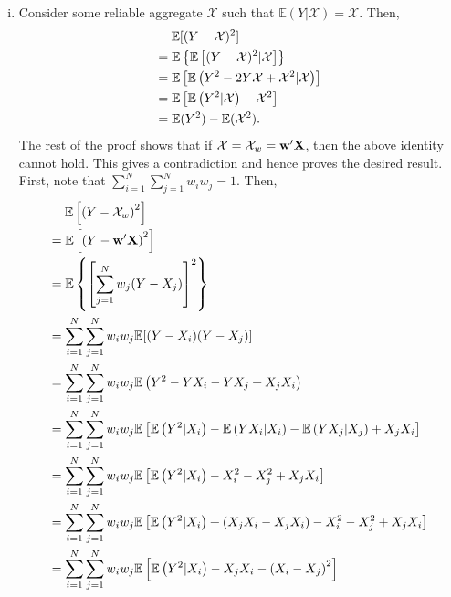 \documentclass[11pt]{article}
\newcommand{\E}{\mathbb{E}}
\theoremstyle{definition}
\theoremstyle{definition}
\def\w{{\bf w}}
\def\X{{\bf X}}
\def\E{{\mathbb E}}
\begin{document}
\begin{enumerate}[i)]
\item Consider some reliable aggregate $\mathcal{X}$ such that $\E(Y | \mathcal{X}) = \mathcal{X}$. Then,
\begin{align*}
&\hspace{1.3em} \E[(Y-\mathcal{X})^2]\\
 &= \E\left\{\E\left[(Y-\mathcal{X})^2|\mathcal{X}\right]\right\}\\
&= \E\left[\E\left(Y^2-2Y\mathcal{X}+\mathcal{X}^2|\mathcal{X} \right)\right]\\
&= \E\left[\E\left(Y^2|\mathcal{X}\right)-\mathcal{X}^2\right]\\
&= \E(Y^2)-\E(\mathcal{X}^2).
\end{align*}
The rest of the proof shows that if $\mathcal{X} = \mathcal{X}_w = \w'\X$, then the above identity cannot hold. This gives a contradiction and hence proves the desired result. First, note that $\sum_{i=1}^N\sum_{j=1}^Nw_iw_j = 1$. Then,
\begin{align*}
&\hspace{1.3em}  \E\left[\left(Y-\mathcal{X}_w\right)^2\right]\\
 &= \E\left[\left(Y-\w'\X\right)^2\right] \\
 &= \E\left\{\left[\sum_{j=1}^Nw_j (Y-X_j)\right]^2\right\} \\
&= \sum_{i=1}^N\sum_{j=1}^Nw_iw_j \E[(Y-X_i)(Y-X_j)] \\
&= \sum_{i=1}^N\sum_{j=1}^Nw_iw_j \E\left(Y^2-YX_i-YX_j+X_jX_i\right) \\
&= \sum_{i=1}^N\sum_{j=1}^Nw_iw_j \E\left[ \E\left( Y^2|X_i \right)-\E\left( YX_i|X_i \right)-\E\left( YX_j|X_j\right)+X_jX_i \right] \\
&= \sum_{i=1}^N\sum_{j=1}^Nw_iw_j \E\left[ \E\left( Y^2|X_i \right)-X_i^2-X_j^2+X_jX_i \right] \\
&= \sum_{i=1}^N\sum_{j=1}^Nw_iw_j \E\left[\E\left(Y^2|X_i\right) +\left(X_jX_i-X_jX_i\right)-X_i^2-X_j^2+X_jX_i\right] \\
&= \sum_{i=1}^N\sum_{j=1}^Nw_iw_j \E\left[\E\left(Y^2|X_i\right) -X_jX_i-\left(X_i-X_j\right)^2\right] \\

\end{align*}
\end{enumerate}
\end{document}
